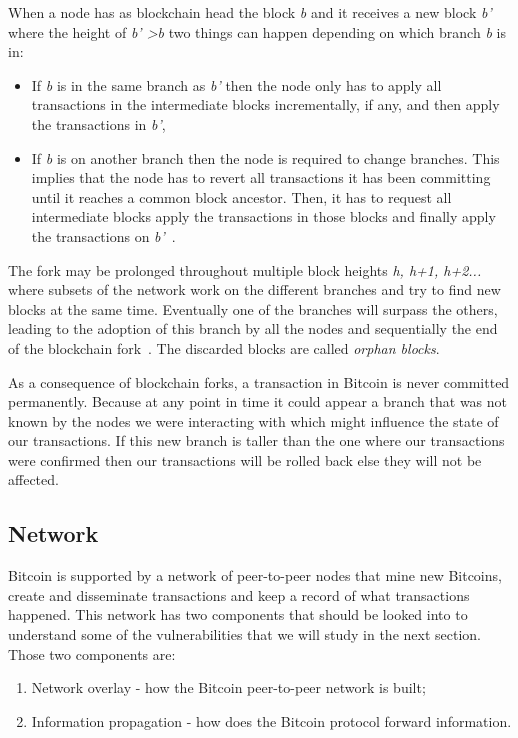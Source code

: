 When a node has as blockchain head the block \textit{b} and it receives a new block \textit{b'} where the height of \textit{b' \textgreater b} two things can happen depending on which branch \textit{b} is in:
\begin{itemize}
\item If \textit{b} is in the same branch as \textit{b'} then the node only has to apply all transactions in the intermediate blocks incrementally, if any, and then apply the transactions in \textit{b'}, 
\item If \textit{b} is on another branch then the node is required to change branches. This implies that the node has to revert all transactions it has been committing until it reaches a common block ancestor. Then, it has to request all intermediate blocks apply the transactions in those blocks and finally apply the transactions on \textit{b'}~\cite{decker2013information}.
\end{itemize}

The fork may be prolonged throughout multiple block heights \textit{h, h+1, h+2...} where subsets of the network work on the different branches and try to find new blocks at the same time. Eventually one of the branches will surpass the others, leading to the adoption of this branch by all the nodes and sequentially the end of the blockchain fork~\cite{decker2013information}. The discarded blocks are called \textit{orphan blocks}.

As a consequence of blockchain forks, a transaction in Bitcoin is never committed permanently. Because at any point in time it could appear a branch that was not known by the nodes we were interacting with which might influence the state of our transactions. If this new branch is taller than the one where our transactions were confirmed then our transactions will be rolled back else they will not be affected. 


\subsection{Network}
\label{sec:network}
Bitcoin is supported by a network of peer-to-peer nodes that mine new Bitcoins, create and disseminate transactions and keep a record of what transactions happened. This network has two components that should be looked into to understand some of the vulnerabilities that we will study in the next section. Those two components are:

\begin{enumerate}
	\item Network overlay - how the Bitcoin peer-to-peer network is built; 
	\item Information propagation - how does the Bitcoin protocol forward information.
\end{enumerate}

